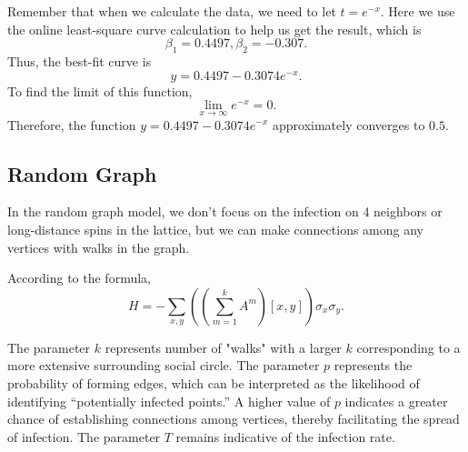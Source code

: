 \documentclass[11pt]{book}
\begin{document}
Remember that when we calculate the data, we need to let $t=e^{-x}$.
Here we use the online least-square curve calculation \cite{curve} to help us get the result, which is
$$
\beta_1=0.4497, \beta_2=-0.307.
$$
Thus, the best-fit curve is
\begin{equation}\label{best_fit_curve}
y=0.4497-0.3074e^{-x}.
\end{equation}
To find the limit of this function,
\[
\lim_{x \to \infty} e^{-x} = 0.
\]
Therefore, the function \( y = 0.4497 - 0.3074e^{-x} \) approximately converges to $0.5$.


\subsection{Random Graph}
In the random graph model, we don't focus on the infection on 4 neighbors or long-distance spins in the lattice, but we can make connections among any vertices with walks in the graph. 

According to the formula, 
\[
H = -\sum_{x,y} \left( (\sum_{m = 1}^{k} A^m)[x, y] \right) \sigma_x \sigma_y.
\]

The parameter $k$ represents number of "walks" with a larger $k$ corresponding to a more extensive surrounding social circle. The parameter $p$ represents the probability of forming edges, which can be interpreted as the likelihood of identifying “potentially infected points.” A higher value of $p$ indicates a greater chance of establishing connections among vertices, thereby facilitating the spread of infection. The parameter $T$ remains indicative of the infection rate.
\end{document}
